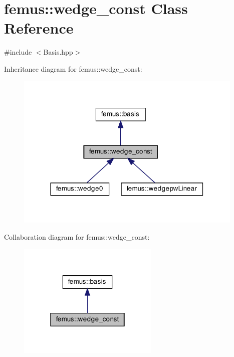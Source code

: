 \hypertarget{classfemus_1_1wedge__const}{}\section{femus\+:\+:wedge\+\_\+const Class Reference}
\label{classfemus_1_1wedge__const}


{\ttfamily \#include $<$Basis.\+hpp$>$}



Inheritance diagram for femus\+:\+:wedge\+\_\+const\+:
\nopagebreak
\begin{figure}[H]
\begin{center}
\leavevmode
\includegraphics[width=308pt]{classfemus_1_1wedge__const__inherit__graph}
\end{center}
\end{figure}


Collaboration diagram for femus\+:\+:wedge\+\_\+const\+:
\nopagebreak
\begin{figure}[H]
\begin{center}
\leavevmode
\includegraphics[width=190pt]{classfemus_1_1wedge__const__coll__graph}
\end{center}
\end{figure}
